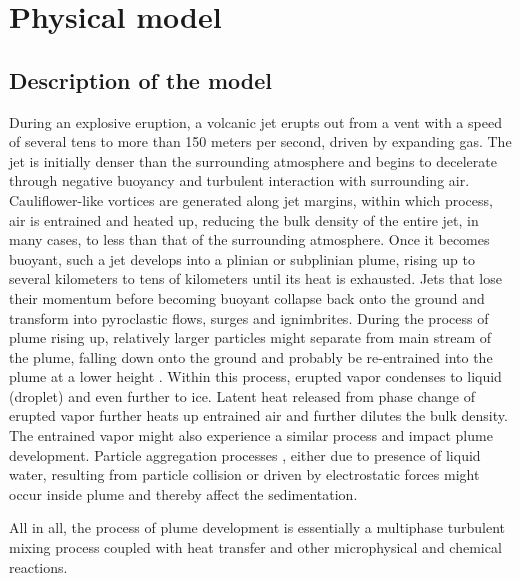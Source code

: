 \documentclass[journal abbreviation, manuscript]{copernicus}
\begin{document}
\section{Physical model} \label{sec:physics-model}
\subsection{Description of the model}
During an explosive eruption, a volcanic jet erupts out from a vent with a speed of several tens to more than 150 meters per second, driven by expanding gas. The jet is initially denser than the surrounding atmosphere and begins to decelerate through negative buoyancy and turbulent interaction with surrounding air. Cauliflower-like vortices are generated along jet margins, within which process, air is entrained and heated up, reducing the bulk density of the entire jet, in many cases, to less than that of the surrounding atmosphere. Once it becomes buoyant, such a jet develops into a plinian or subplinian plume, rising up to several kilometers to tens of kilometers until its heat is exhausted. Jets that lose their momentum before becoming buoyant collapse back onto the ground and transform into pyroclastic flows, surges and ignimbrites. During the process of plume rising up, relatively larger particles might separate from main stream of the plume, falling down onto the ground and probably be re-entrained into the plume at a lower height \citep{ernst1996sedimentation}. Within this process, erupted vapor condenses to liquid (droplet) and even further to ice. Latent heat released from phase change of erupted vapor  further heats up entrained air and further dilutes the bulk density. The entrained vapor might also experience a similar process and impact plume development. Particle aggregation processes \citep{carey1982influence,taddeucci2011aggregation}, either due to presence of liquid water, resulting from particle collision or driven by electrostatic forces might occur inside plume and thereby affect the sedimentation. 

All in all, the process of plume development is  essentially a multiphase turbulent mixing process coupled with heat transfer and other microphysical and chemical reactions.
\end{document}
